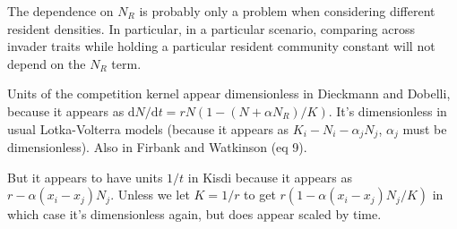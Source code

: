\documentclass[12pt,a4paper]{article}
\newcommand{\ud}{\ensuremath{\mathrm{d}}}
\begin{document}
The dependence on $N_R$ is probably only a problem when considering
different resident densities.  In particular, in a particular
scenario, comparing across invader traits while holding a particular
resident community constant will not depend on the $N_R$ term.

Units of the competition kernel appear dimensionless in Dieckmann and
Dobelli, because it appears as $\ud N / \ud t = r N(1 - (N + \alpha
N_R)/K)$.  It's dimensionless in usual Lotka-Volterra models (because
it appears as $K_i - N_i - \alpha_j N_j$, $\alpha_j$ must be
dimensionless).  Also in Firbank and Watkinson (eq 9). 

But it appears to have units $1/t$ in Kisdi because it appears as $r -
\alpha(x_i - x_j)N_j$.  Unless we let $K = 1/r$ to get $r(1 -
\alpha(x_i - x_j)N_j / K)$ in which case it's dimensionless again, but
does appear scaled by time.
\end{document}
